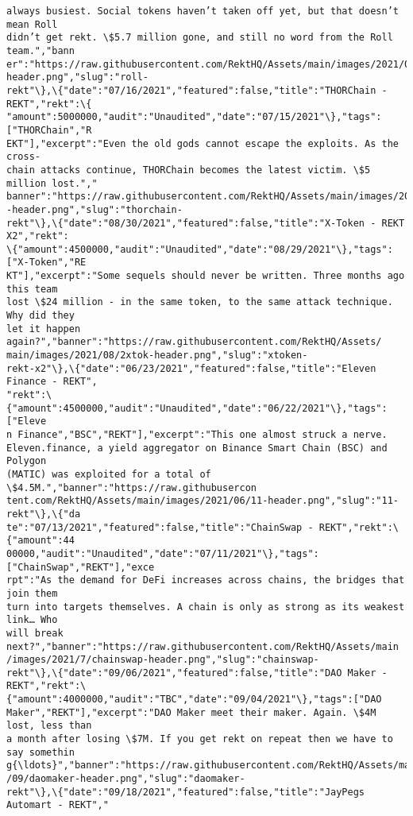 \documentclass[11pt]{article}
\begin{document}
\begin{Verbatim}[commandchars=\\\{\}]
always busiest. Social tokens haven’t taken off yet, but that doesn’t mean Roll
didn’t get rekt. \$5.7 million gone, and still no word from the Roll team.","bann
er":"https://raw.githubusercontent.com/RektHQ/Assets/main/images/2021/03/roll-
header.png","slug":"roll-
rekt"\},\{"date":"07/16/2021","featured":false,"title":"THORChain - REKT","rekt":\{
"amount":5000000,"audit":"Unaudited","date":"07/15/2021"\},"tags":["THORChain","R
EKT"],"excerpt":"Even the old gods cannot escape the exploits. As the cross-
chain attacks continue, THORChain becomes the latest victim. \$5 million lost.","
banner":"https://raw.githubusercontent.com/RektHQ/Assets/main/images/2021/7/thor
-header.png","slug":"thorchain-
rekt"\},\{"date":"08/30/2021","featured":false,"title":"X-Token - REKT X2","rekt":
\{"amount":4500000,"audit":"Unaudited","date":"08/29/2021"\},"tags":["X-Token","RE
KT"],"excerpt":"Some sequels should never be written. Three months ago this team
lost \$24 million - in the same token, to the same attack technique. Why did they
let it happen again?","banner":"https://raw.githubusercontent.com/RektHQ/Assets/
main/images/2021/08/2xtok-header.png","slug":"xtoken-
rekt-x2"\},\{"date":"06/23/2021","featured":false,"title":"Eleven Finance - REKT",
"rekt":\{"amount":4500000,"audit":"Unaudited","date":"06/22/2021"\},"tags":["Eleve
n Finance","BSC","REKT"],"excerpt":"This one almost struck a nerve.
Eleven.finance, a yield aggregator on Binance Smart Chain (BSC) and Polygon
(MATIC) was exploited for a total of \$4.5M.","banner":"https://raw.githubusercon
tent.com/RektHQ/Assets/main/images/2021/06/11-header.png","slug":"11-rekt"\},\{"da
te":"07/13/2021","featured":false,"title":"ChainSwap - REKT","rekt":\{"amount":44
00000,"audit":"Unaudited","date":"07/11/2021"\},"tags":["ChainSwap","REKT"],"exce
rpt":"As the demand for DeFi increases across chains, the bridges that join them
turn into targets themselves. A chain is only as strong as its weakest link… Who
will break next?","banner":"https://raw.githubusercontent.com/RektHQ/Assets/main
/images/2021/7/chainswap-header.png","slug":"chainswap-
rekt"\},\{"date":"09/06/2021","featured":false,"title":"DAO Maker -
REKT","rekt":\{"amount":4000000,"audit":"TBC","date":"09/04/2021"\},"tags":["DAO
Maker","REKT"],"excerpt":"DAO Maker meet their maker. Again. \$4M lost, less than
a month after losing \$7M. If you get rekt on repeat then we have to say somethin
g{\ldots}","banner":"https://raw.githubusercontent.com/RektHQ/Assets/main/images/2021
/09/daomaker-header.png","slug":"daomaker-
rekt"\},\{"date":"09/18/2021","featured":false,"title":"JayPegs Automart - REKT","

\end{Verbatim}
\end{document}
